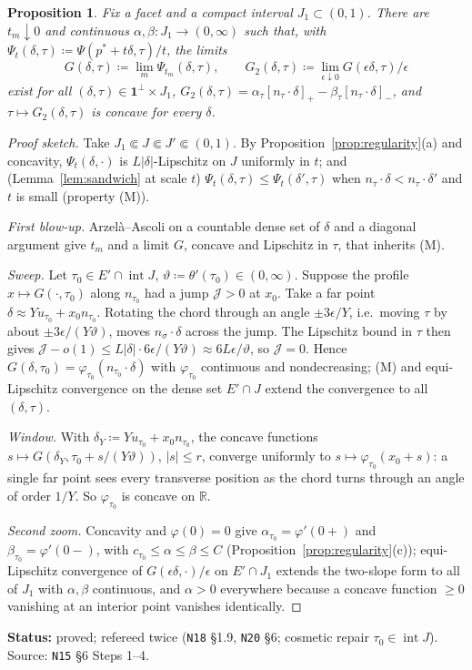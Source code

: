 \documentclass[11pt]{article}
\newtheorem{proposition}[theorem]{Proposition}
\theoremstyle{definition}
\theoremstyle{remark}
\newcommand{\R}{\mathbb R}
\newcommand{\one}{\mathbf 1}
\newcommand{\src}[1]{\texttt{#1}}
\newcommand{\status}[1]{\par\smallskip\noindent\textbf{Status:} #1\par\smallskip}
\begin{document}
\begin{proposition}\label{prop:blowup}
Fix a facet and a compact interval $J_1\subset(0,1)$. There are $t_m\downarrow0$ and continuous $\alpha,\beta:J_1\to(0,\infty)$ such that, with $\Psi_t(\delta,\tau)\coloneqq\Psi(p^*+t\delta,\tau)/t$, the limits
\[
G(\delta,\tau)\coloneqq\lim_m\Psi_{t_m}(\delta,\tau),\qquad G_2(\delta,\tau)\coloneqq\lim_{\epsilon\downarrow0}G(\epsilon\delta,\tau)/\epsilon
\]
exist for all $(\delta,\tau)\in\one^\perp\times J_1$, $G_2(\delta,\tau)=\alpha_\tau[n_\tau\cdot\delta]_+-\beta_\tau[n_\tau\cdot\delta]_-$, and $\tau\mapsto G_2(\delta,\tau)$ is concave for every $\delta$.
\end{proposition}
\begin{proof}[Proof sketch]
Take $J_1\Subset J\Subset J'\Subset(0,1)$. By Proposition~\ref{prop:regularity}(a) and concavity, $\Psi_t(\delta,\cdot)$ is $L|\delta|$-Lipschitz on $J$ uniformly in $t$; and (Lemma~\ref{lem:sandwich} at scale $t$) $\Psi_t(\delta,\tau)\le\Psi_t(\delta',\tau)$ when $n_\tau\cdot\delta<n_\tau\cdot\delta'$ and $t$ is small (property (M)).

\emph{First blow-up.} Arzel\`a--Ascoli on a countable dense set of $\delta$ and a diagonal argument give $t_m$ and a limit $G$, concave and Lipschitz in $\tau$, that inherits (M).

\emph{Sweep.} Let $\tau_0\in E'\cap\operatorname{int}J$, $\vartheta\coloneqq\theta'(\tau_0)\in(0,\infty)$. Suppose the profile $x\mapsto G(\cdot,\tau_0)$ along $n_{\tau_0}$ had a jump $\mathcal J>0$ at $x_0$. Take a far point $\delta\approx Yu_{\tau_0}+x_0n_{\tau_0}$. Rotating the chord through an angle $\pm3\epsilon/Y$, i.e.\ moving $\tau$ by about $\pm3\epsilon/(Y\vartheta)$, moves $n_\sigma\cdot\delta$ across the jump. The Lipschitz bound in $\tau$ then gives $\mathcal J-o(1)\le L|\delta|\cdot6\epsilon/(Y\vartheta)\approx6L\epsilon/\vartheta$, so $\mathcal J=0$. Hence $G(\delta,\tau_0)=\varphi_{\tau_0}(n_{\tau_0}\cdot\delta)$ with $\varphi_{\tau_0}$ continuous and nondecreasing; (M) and equi-Lipschitz convergence on the dense set $E'\cap J$ extend the convergence to all $(\delta,\tau)$.

\emph{Window.} With $\delta_Y\coloneqq Yu_{\tau_0}+x_0n_{\tau_0}$, the concave functions $s\mapsto G(\delta_Y,\tau_0+s/(Y\vartheta))$, $|s|\le r$, converge uniformly to $s\mapsto\varphi_{\tau_0}(x_0+s)$: a single far point sees every transverse position as the chord turns through an angle of order $1/Y$. So $\varphi_{\tau_0}$ is concave on $\R$.

\emph{Second zoom.} Concavity and $\varphi(0)=0$ give $\alpha_{\tau_0}=\varphi'(0+)$ and $\beta_{\tau_0}=\varphi'(0-)$, with $c_{\tau_0}\le\alpha\le\beta\le C$ (Proposition~\ref{prop:regularity}(c)); equi-Lipschitz convergence of $G(\epsilon\delta,\cdot)/\epsilon$ on $E'\cap J_1$ extends the two-slope form to all of $J_1$ with $\alpha,\beta$ continuous, and $\alpha>0$ everywhere because a concave function $\ge0$ vanishing at an interior point vanishes identically.
\end{proof}
\status{proved; refereed twice (\src{N18} \S1.9, \src{N20} \S6; cosmetic repair $\tau_0\in\operatorname{int}J$). Source: \src{N15} \S6 Steps 1--4.}
\end{document}
